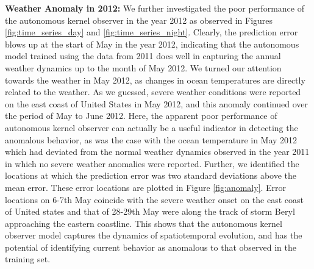 \documentclass[letterpaper,12pt,peerreviewca,draftcls]{IEEEtran}
\begin{document}
\textbf{Weather Anomaly in 2012:} We further investigated the poor performance of the autonomous kernel observer in the year 2012 as observed in Figures \ref{fig:time_series_day} and \ref{fig:time_series_night}. Clearly, the prediction error blows up at the start of May in the year 2012, indicating that the autonomous model trained using the data from 2011 does well in capturing the annual weather dynamics up to the month of May 2012. We turned our attention towards the weather in May 2012, as changes in ocean temperatures are directly related to the weather. As we guessed, severe weather conditions were reported on the east coast of United States in May 2012, and this anomaly continued over the period of May to June 2012. Here, the apparent poor performance of autonomous kernel observer can actually be a useful indicator in detecting the anomalous behavior, as was the case with the ocean temperature in May 2012 which had deviated from the normal weather dynamics observed in the year 2011 in which no severe weather anomalies were reported. Further, we identified the locations at which the prediction error was two standard deviations above the mean error. These error locations are plotted in Figure \ref{fig:anomaly}. Error locations on 6-7th May coincide with the severe weather onset on the east coast of United states and that of 28-29th May were along the track of storm Beryl approaching the eastern coastline. This shows that the autonomous kernel observer model captures the dynamics of spatiotemporal evolution, and has the potential of identifying current behavior as anomalous to that observed in the training set.
 
\end{document}

